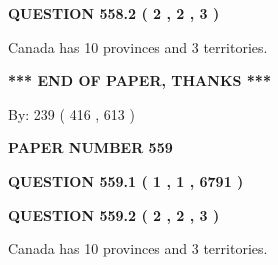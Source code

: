 \documentclass[12pt]{article}
\begin{document}
  
  
\vspace{0.2in}
  
{\textbf{\Large{QUESTION
558.2 
 ( 2 , 2 , 3 )
}}}
  
  
 
 
\noindent{}
 
 
Canada has 10  provinces and 3 territories.
 
 
 
 
   
   
 \vspace{0.2in}
 
   
   
   
   
\vspace{1.0in} 
{\textbf{\large{ *** END OF PAPER, THANKS *** }}} 
   
   
\hspace{1.0in} By: 
 239 ( 416 ,  613 )
   
   
   
   
\newpage 
\setcounter{page}{ 
   559001 } 
   
   
   
   
 {\textbf{ \Large{ PAPER NUMBER  559  }}}
   
   
\vspace{0.2in}
   
   
   
   
   
   
 \vspace{0.2in}
 
 
 
 
   
   
  
\vspace{0.2in}
  
{\textbf{\Large{QUESTION
559.1 
 ( 1 , 1 , 6791 )
}}}
  
  
  
\vspace{0.2in}
  
{\textbf{\Large{QUESTION
559.2 
 ( 2 , 2 , 3 )
}}}
  
  
 
 
\noindent{}
 
 
Canada has 10  provinces and 3 territories.
 
\end{document}
